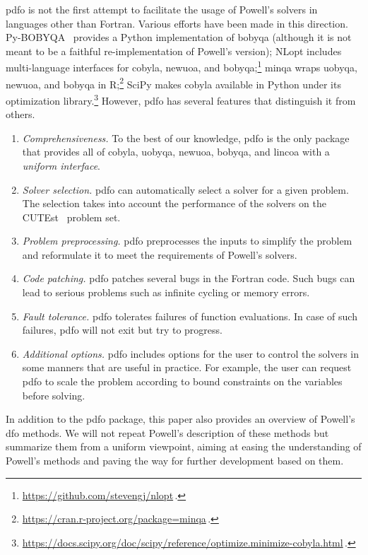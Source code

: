 \documentclass[smallextended]{svjour3}
\begin{document}
\Gls{pdfo} is not the first attempt to facilitate the usage of Powell's solvers in languages other than Fortran.
Various efforts have been made in this direction.
Py-BOBYQA~\cite{Cartis_Etal_2019,Cartis_Roberts_Sheridan-Methven_2022} provides a Python implementation of \gls{bobyqa} (although it is not meant to be a faithful re-implementation of Powell's version); NLopt includes multi-language interfaces for \gls{cobyla}, \gls{newuoa}, and \gls{bobyqa};\footnote{\url{https://github.com/stevengj/nlopt}\,.} minqa wraps \gls{uobyqa}, \gls{newuoa}, and \gls{bobyqa} in R;\footnote{\url{https://cran.r-project.org/package=minqa}\,.} SciPy makes \gls{cobyla} available in Python under its optimization library.\footnote{\url{https://docs.scipy.org/doc/scipy/reference/optimize.minimize-cobyla.html}\,.}
However, \gls{pdfo} has several features that distinguish it from others.
\begin{enumerate}
    \item \emph{Comprehensiveness.}
        To the best of our knowledge, \gls{pdfo} is the only package that provides all of \gls{cobyla}, \gls{uobyqa}, \gls{newuoa}, \gls{bobyqa}, and \gls{lincoa} with a \emph{uniform interface}.
    \item \emph{Solver selection.}
        \Gls{pdfo} can automatically select a solver for a given problem.
        The selection takes into account the performance of the solvers on the CUTEst~\cite{Gould_Orban_Toint_2015} problem set.
    \item \emph{Problem preprocessing.}
        \Gls{pdfo} preprocesses the inputs to simplify the problem and reformulate it to meet the requirements of Powell's solvers.
    \item \emph{Code patching.}
        \Gls{pdfo} patches several bugs in the Fortran code.
        Such bugs can lead to serious problems such as infinite cycling or memory errors.
    \item \emph{Fault tolerance.}
        \Gls{pdfo} tolerates failures of function evaluations.
        In case of such failures, \gls{pdfo} will not exit but try to progress.
    \item \emph{Additional options.}
        \gls{pdfo} includes options for the user to control the solvers in some manners that are useful in practice.
        For example, the user can request \gls{pdfo} to scale the problem according to bound constraints on the variables before solving.
\end{enumerate}

In addition to the \gls{pdfo} package, this paper also provides an overview of Powell's \gls{dfo} methods.
We will not repeat Powell's description of these methods but summarize them from a uniform viewpoint, aiming at easing the understanding of Powell's methods and paving the way for further development based on them.
\end{document}
